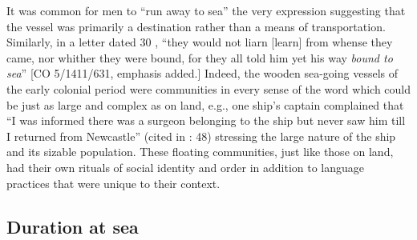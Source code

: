 It was common for men to “run away to sea” \citep[67,]{Jarvis2010} the very expression suggesting that the vessel was primarily a destination rather than a means of transportation. Similarly, in a letter dated 30 \citealt{July1699}, “they would not liarn [learn] from whense they came, nor whither they were bound, for they all told him yet his way \textit{bound to sea}” [CO 5/1411/631, emphasis added.] Indeed, the wooden sea-going vessels of the early colonial period were communities in every sense of the word which could be just as large and complex as on land, e.g., one ship’s captain complained that “I was informed there was a surgeon belonging to the ship but never saw him till I returned from Newcastle” (cited in \citealt{Brown2011}: 48) stressing the large nature of the ship and its sizable population. These floating communities, just like those on land, had their own rituals of social identity and order in addition to language practices that were unique to their context.

\subsection{{Duration} {at} {sea}}%

